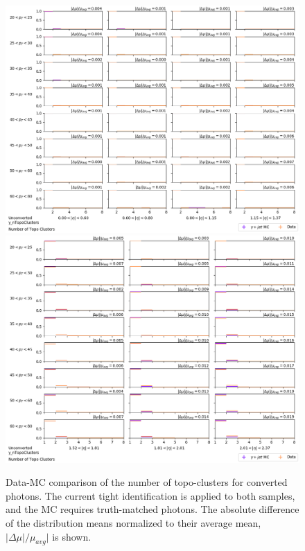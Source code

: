 \begin{figure}[!thp]
    \centering
    \includegraphics[width=.74\textwidth]{appendices/datamc_images/y_nTopoClusters_Unconverted_lowerEta.png}
    \includegraphics[width=.74\textwidth]{appendices/datamc_images/y_nTopoClusters_Unconverted_upperEta.png}
    \caption[Data-MC comparison of the number of topo-clusters for converted photons]{Data-MC comparison of the number of topo-clusters for converted photons. The current tight identification is applied to both samples, and the \gls{MC} requires truth-matched photons. The absolute difference of the distribution means normalized to their average mean, $|\Delta \mu|/\mu_{avg}|$ is shown.}
    \label{fig:dmc-u-ntopo}
\end{figure}
